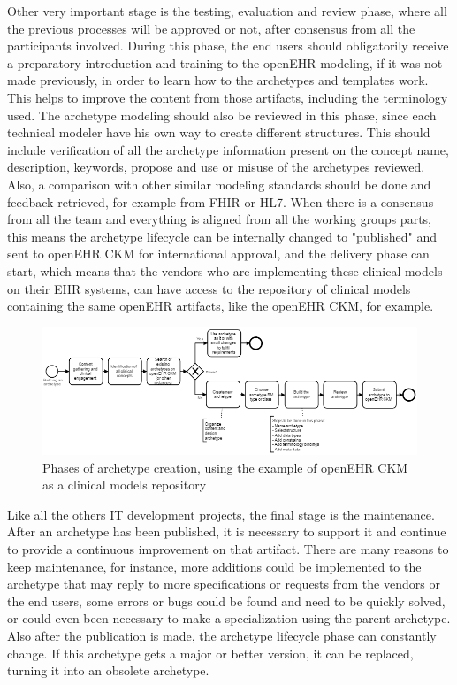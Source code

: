 \documentclass[mim_thesis.tex]{subfiles}
\begin{document}
Other very important stage is the testing, evaluation and review phase, where all the previous processes will be approved or not, after consensus from all the participants involved. During this phase, the end users should obligatorily receive a preparatory introduction and training to the openEHR modeling, if it was not made previously, in order to learn how to the archetypes and templates work. This helps to improve the content from those artifacts, including the terminology used. The archetype modeling should also be reviewed in this phase, since each technical modeler have his own way to create different structures. This should include verification of all the archetype information present on the concept name, description, keywords, propose and use or misuse of the archetypes reviewed. Also, a comparison with other similar modeling standards should be done and feedback retrieved, for example from FHIR or HL7. When there is a consensus from all the team and everything is aligned from all the working groups parts, this means the archetype lifecycle can be internally changed to "published" and sent to openEHR CKM for international approval, and the delivery phase can start, which means that the vendors who are implementing these clinical models on their EHR systems, can have access to the repository of clinical models containing the same openEHR artifacts, like the openEHR CKM, for example. \\

\begin{figure}[H]
	\centering
    \includegraphics[width=1.15\textwidth]{img/archetype_build_process.PNG}
	\caption{Phases of archetype creation, using the example of openEHR CKM as a clinical models repository}
	\label{fig:LC_ARCH}
\end{figure}



\newpage

Like all the others IT development projects, the final stage is the maintenance. After an archetype has been published, it is necessary to support it and continue to provide a continuous improvement on that artifact. There are many reasons to keep maintenance, for instance, more additions could be implemented to the archetype that may reply to more specifications or requests from the vendors or the end users, some errors or bugs could be found and need to be quickly solved, or could even been necessary to make a specialization using the parent archetype. Also after the publication is made, the archetype lifecycle phase can constantly change. If this archetype gets a major or better version, it can be replaced, turning it into an obsolete archetype. \\
\end{document}
